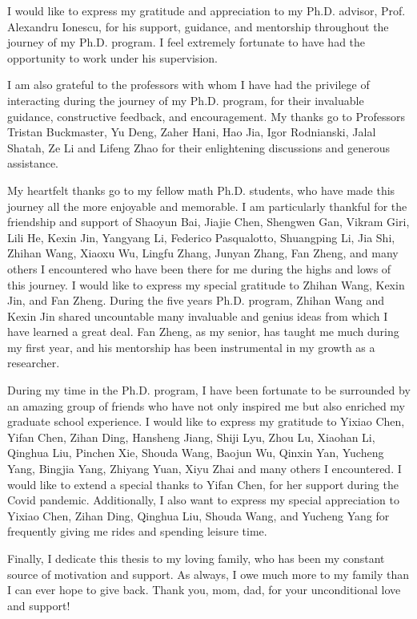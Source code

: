 I would like to express my gratitude and appreciation to my Ph.D. advisor, Prof. Alexandru Ionescu, for his support, guidance, and mentorship throughout the journey of my Ph.D. program. I feel extremely fortunate to have had the opportunity to work under his supervision.

I am also grateful to the professors with whom I have had the privilege of interacting during the journey of my Ph.D. program, for their invaluable guidance, constructive feedback, and encouragement. My thanks go to Professors Tristan Buckmaster, Yu Deng, Zaher Hani, Hao Jia, Igor Rodnianski, Jalal Shatah, Ze Li and Lifeng Zhao for their enlightening discussions and generous assistance.

My heartfelt thanks go to my fellow math Ph.D. students, who have made this journey all the more enjoyable and memorable. I am particularly thankful for the friendship and support of Shaoyun Bai, Jiajie Chen, Shengwen Gan, Vikram Giri, Lili He, Kexin Jin, Yangyang Li, Federico Pasqualotto, Shuangping Li, Jia Shi, Zhihan Wang, Xiaoxu Wu, Lingfu Zhang, Junyan Zhang, Fan Zheng, and many others I encountered who have been there for me during the highs and lows of this journey. I would like to express my special gratitude to Zhihan Wang, Kexin Jin, and Fan Zheng. During the five years Ph.D. program, Zhihan Wang and Kexin Jin shared uncountable many invaluable and genius ideas from which I have learned a great deal.  Fan Zheng, as my senior, has taught me much during my first year, and his mentorship has been instrumental in my growth as a researcher.


During my time in the Ph.D. program, I have been fortunate to be surrounded by an amazing group of friends who have not only inspired me but also enriched my graduate school experience. I would like to express my gratitude to Yixiao Chen, Yifan Chen, Zihan Ding, Hansheng Jiang, Shiji Lyu, Zhou Lu, Xiaohan Li, Qinghua Liu, Pinchen Xie, Shouda Wang, Baojun Wu, Qinxin Yan, Yucheng Yang, Bingjia Yang, Zhiyang Yuan, Xiyu Zhai and many others I encountered. I would like to extend a special thanks to Yifan Chen, for her support during the Covid pandemic. Additionally, I also want to express my special appreciation to Yixiao Chen, Zihan Ding, Qinghua Liu, Shouda Wang, and Yucheng Yang for frequently giving me rides and spending leisure time.

Finally, I dedicate this thesis to my loving family, who has been my constant source of motivation and support. As always, I owe much more to my family than I can ever hope to give back. Thank you, mom, dad, for your unconditional love and support!

\newpage

\ 

\vspace{20em}


